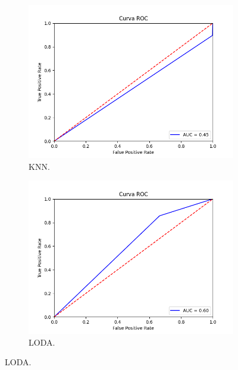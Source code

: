 \begin{figure}[H]
	\centering
	\begin{subfigure}{.49\textwidth}
		\centering
		\includegraphics[scale=0.42]{imagenes/roc/KNN_roc.png}
		\caption{KNN.}
	\end{subfigure}
	\begin{subfigure}{.49\textwidth}
		\centering
		\includegraphics[scale=0.42]{imagenes/roc/LODA_roc.png}
		\caption{LODA.}
	\end{subfigure}
	\label{img:roc5}
\end{figure}

